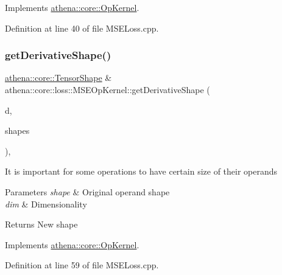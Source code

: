 Implements \mbox{\hyperlink{classathena_1_1core_1_1_op_kernel_ad500db1afc5a7c10acff8ecb8f1bee4d}{athena\+::core\+::\+Op\+Kernel}}.



Definition at line 40 of file M\+S\+E\+Loss.\+cpp.

\mbox{\label{classathena_1_1core_1_1loss_1_1_m_s_e_op_kernel_a68a0220e3a3591638c7725b5cb659609}} 
\subsubsection{\texorpdfstring{get\+Derivative\+Shape()}{getDerivativeShape()}}
{\footnotesize\ttfamily \mbox{\hyperlink{classathena_1_1core_1_1_tensor_shape}{athena\+::core\+::\+Tensor\+Shape}} \& athena\+::core\+::loss\+::\+M\+S\+E\+Op\+Kernel\+::get\+Derivative\+Shape (\begin{DoxyParamCaption}\item[{int}]{d,  }\item[{std\+::vector$<$ \mbox{\hyperlink{classathena_1_1core_1_1_tensor_shape}{athena\+::core\+::\+Tensor\+Shape}} $>$ \&}]{shapes }\end{DoxyParamCaption})\hspace{0.3cm}{\ttfamily [override]}, {\ttfamily [virtual]}}

It is important for some operations to have certain size of their operands 
\begin{DoxyParams}{Parameters}
{\em shape} & Original operand shape \\
\hline
{\em dim} & Dimensionality \\
\hline
\end{DoxyParams}
\begin{DoxyReturn}{Returns}
New shape 
\end{DoxyReturn}


Implements \mbox{\hyperlink{classathena_1_1core_1_1_op_kernel_ad95af6dd184ce7ee9182ec7ca54b6c4d}{athena\+::core\+::\+Op\+Kernel}}.



Definition at line 59 of file M\+S\+E\+Loss.\+cpp.

\mbox{\label{classathena_1_1core_1_1loss_1_1_m_s_e_op_kernel_ab851ee62ea95c3aab8aab2d28cfa9d04}} 
